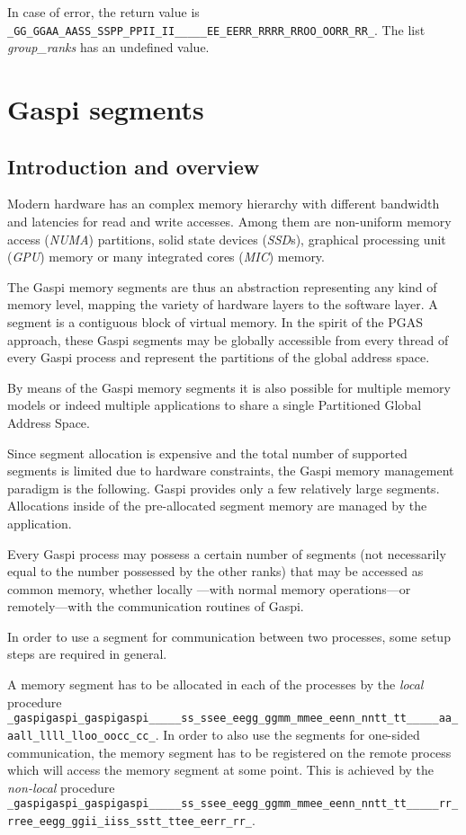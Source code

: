 \documentclass[a4paper]{article}
\makeatletter
\newlength{\st}\setlength{\st}{0pt}
\newcommand{\zerowsep}{\hskip 0pt plus 0.1pt minus 0.1pt}
\newcommand{\ZSEP}[1]{\ifx#1\@@@EOZ@@@\let\next\relax\else\ifx#1\_#1\zerowsep\else#1\fi\let\next\ZSEP\fi\next}
\newcommand{\zsep}[1]{\ZSEP{}#1\@@@EOZ@@@}
\newcommand{\gaspiprefix}{gaspi}
\newcommand{\GASPI}{{\sc Gaspi}}
\newcommand{\function}[1]{{\tt #1}}
\newcommand{\parameter}[1]{{\it #1}}
\newcommand{\gaspifunction}[1]{\function{\protect\zsep{\gaspiprefix\_#1}}}
\newcommand{\GASPIGERR}{{\tt\protect\zsep{GASPI\_ERROR}}}
\newcommand{\gaspisemantic}[1]{{\emph{#1}}}
\makeatother
\begin{document}
In case of error, the return value is \GASPIGERR{}. The list
\parameter{group\_ranks} has an undefined value.

\section{\GASPI{} segments}

\subsection{Introduction and overview}

Modern hardware has an complex memory hierarchy with different
bandwidth and latencies for read and write accesses. Among them are
non-uniform memory access (\emph{NUMA}) partitions, solid state
devices (\emph{SSD}s), graphical processing unit (\emph{GPU}) memory
or many integrated cores (\emph{MIC}) memory.

The \GASPI{} memory segments are thus an abstraction representing
any kind of memory level, mapping the variety of hardware layers to the
software layer. A segment is a contiguous block of virtual memory.
In the spirit of the PGAS approach, these \GASPI{}
segments may be globally accessible from every thread of every \GASPI{}
process and represent the partitions of the global address space.

By means of the \GASPI{} memory segments it is also possible for multiple
memory models or indeed multiple applications to share a single Partitioned Global
Address Space.

Since segment allocation is expensive and the total number of supported
segments is limited due to hardware constraints, the \GASPI{} memory
management paradigm is the following.
\GASPI{} provides only a few relatively large segments.
Allocations inside of the pre-allocated segment memory are managed
by the application.

Every \GASPI{} process may possess a certain number of segments (not
necessarily equal to the number possessed by the other ranks) that may be accessed as common memory,
whether locally ---with normal memory operations---or remotely---with
the communication routines of \GASPI{}.

In order to use a segment for communication between two processes,
some setup steps are required in general.

A memory segment has to be allocated in each of the processes
by the \gaspisemantic{local} procedure \gaspifunction{segment\_alloc}.
In order to also use the segments for one-sided communication, the memory segment
has to be registered on the remote process which will
access the memory segment at some point. This is achieved by the
\gaspisemantic{non-local} procedure \gaspifunction{segment\_register}.
\end{document}
